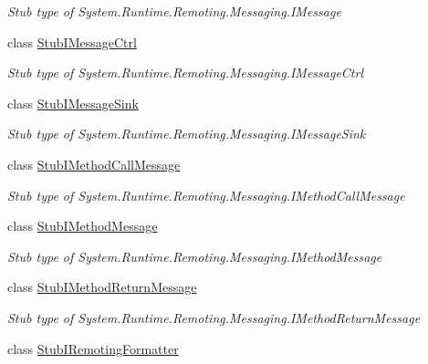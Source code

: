 \begin{DoxyCompactItemize}
\begin{DoxyCompactList}\small\item\em Stub type of System.\-Runtime.\-Remoting.\-Messaging.\-I\-Message\end{DoxyCompactList}\item 
class \hyperlink{class_system_1_1_runtime_1_1_remoting_1_1_messaging_1_1_fakes_1_1_stub_i_message_ctrl}{Stub\-I\-Message\-Ctrl}
\begin{DoxyCompactList}\small\item\em Stub type of System.\-Runtime.\-Remoting.\-Messaging.\-I\-Message\-Ctrl\end{DoxyCompactList}\item 
class \hyperlink{class_system_1_1_runtime_1_1_remoting_1_1_messaging_1_1_fakes_1_1_stub_i_message_sink}{Stub\-I\-Message\-Sink}
\begin{DoxyCompactList}\small\item\em Stub type of System.\-Runtime.\-Remoting.\-Messaging.\-I\-Message\-Sink\end{DoxyCompactList}\item 
class \hyperlink{class_system_1_1_runtime_1_1_remoting_1_1_messaging_1_1_fakes_1_1_stub_i_method_call_message}{Stub\-I\-Method\-Call\-Message}
\begin{DoxyCompactList}\small\item\em Stub type of System.\-Runtime.\-Remoting.\-Messaging.\-I\-Method\-Call\-Message\end{DoxyCompactList}\item 
class \hyperlink{class_system_1_1_runtime_1_1_remoting_1_1_messaging_1_1_fakes_1_1_stub_i_method_message}{Stub\-I\-Method\-Message}
\begin{DoxyCompactList}\small\item\em Stub type of System.\-Runtime.\-Remoting.\-Messaging.\-I\-Method\-Message\end{DoxyCompactList}\item 
class \hyperlink{class_system_1_1_runtime_1_1_remoting_1_1_messaging_1_1_fakes_1_1_stub_i_method_return_message}{Stub\-I\-Method\-Return\-Message}
\begin{DoxyCompactList}\small\item\em Stub type of System.\-Runtime.\-Remoting.\-Messaging.\-I\-Method\-Return\-Message\end{DoxyCompactList}\item 
class \hyperlink{class_system_1_1_runtime_1_1_remoting_1_1_messaging_1_1_fakes_1_1_stub_i_remoting_formatter}{Stub\-I\-Remoting\-Formatter}

\end{DoxyCompactItemize}
